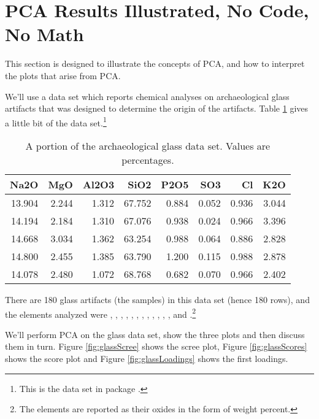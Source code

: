 \documentclass[10pt,twocolumn,twoside,]{pinp}
\begin{document}
\hypertarget{pca-results-illustrated-no-code-no-math}{%
\section{PCA Results Illustrated, No Code, No
Math}\label{pca-results-illustrated-no-code-no-math}}

This section is designed to illustrate the concepts of PCA, and how to
interpret the plots that arise from PCA.

We'll use a data set which reports chemical analyses on archaeological
glass artifacts that was designed to determine the origin of the
artifacts. Table \ref{tab:dataTaste} gives a little bit of the data
set.\footnote{This is the  data set in package .}

\begin{table}

\caption{\label{tab:dataTaste}A portion of the archaeological glass data set. Values are percentages.\label{tab:dataTaste}}
\centering
\begin{tabular}[t]{r|r|r|r|r|r|r|r}
\hline
Na2O & MgO & Al2O3 & SiO2 & P2O5 & SO3 & Cl & K2O\\
\hline
13.904 & 2.244 & 1.312 & 67.752 & 0.884 & 0.052 & 0.936 & 3.044\\
\hline
14.194 & 2.184 & 1.310 & 67.076 & 0.938 & 0.024 & 0.966 & 3.396\\
\hline
14.668 & 3.034 & 1.362 & 63.254 & 0.988 & 0.064 & 0.886 & 2.828\\
\hline
14.800 & 2.455 & 1.385 & 63.790 & 1.200 & 0.115 & 0.988 & 2.878\\
\hline
14.078 & 2.480 & 1.072 & 68.768 & 0.682 & 0.070 & 0.966 & 2.402\\
\hline
\end{tabular}
\end{table}

There are 180 glass artifacts (the samples) in this data set (hence 180
rows), and the elements analyzed were , , ,
, , , , , , ,
, , and 
.\footnote{The elements are reported as their oxides in the form of weight percent.}

We'll perform PCA on the glass data set, show the three plots and then
discuss them in turn. Figure \ref{fig:glassScree} shows the scree plot,
Figure \ref{fig:glassScores} shows the score plot and Figure
\ref{fig:glassLoadings} shows the first loadings.
\end{document}
